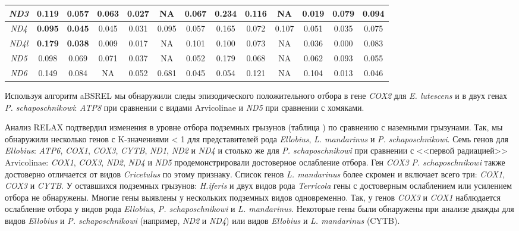 \begin{landscape}
\begin{table}[]
\begin{tabular}{|c|c|c|c|c|c|c|c|c|c|c|c|c|}
			\textit{ND3} & 0.119 & 0.057 & 0.063 & 0.027 & NA & 0.067 & 0.234 & 0.116 & NA & 0.019 & 0.079& 0.094 \\ \hline
			\textit{ND4} & \textbf{0.095} & \textbf{0.045} & 0.045 & 0.031 & 0.095 & 0.057 & 0.165 & 0.072 & 0.107 & 0.051 & 0.035& 0.075 \\ \hline
			\textit{ND4l} & \textbf{0.179} & \textbf{0.038} & 0.009 & 0.017 & NA & 0.101 & 0.100 & 0.073 & NA & 0.036 & 0.000& 0.083 \\ \hline
			{\textit{ND5}} & 0.098 & 0.069 & 0.071 & 0.037 & NA & 0.052 & 0.179 & 0.068 & NA & 0.062 & 0.093& 0.055 \\ \hline
			\textit{ND6} & 0.149 & 0.084 & NA & 0.052 & 0.681 & 0.045 & 0.054 & 0.121 & NA & 0.104 & 0.013& 0.046 \\ \hline
			
		\end{tabular}
	\end{table}

\end{landscape}


Используя алгоритм aBSREL мы обнаружили следы эпизодического положительного отбора в гене \textit{COX2} для \textit{E. lutescens} и в двух генах \textit{P. schaposchnikowi}: \textit{ATP8} при сравнении с видами Arvicolinae и \textit{ND5} при сравнении с хомяками.


Анализ RELAX подтвердил изменения в уровне отбора подземных грызунов (таблица ) по сравнению с наземными грызунами. Так, мы обнаружили несколько генов с K-значениями < 1 для представителей рода \textit{Ellobius}, \textit{L. mandarinus} и \textit{P. schaposchnikowi}. Семь генов для \textit{Ellobius}: \textit{ATP6}, \textit{COX1}, \textit{COX3}, \textit{CYTB}, \textit{ND1}, \textit{ND2} и \textit{ND4} и столько же для \textit{P. schaposchnikowi} при сравнении с <<первой радиацией>> Arvicolinae: \textit{COX1}, \textit{COX3}, \textit{ND2}, \textit{ND4} и \textit{ND5} продемонстрировали достоверное ослабление отбора. Ген \textit{COX3} \textit{P. schaposchnikowi} также достоверно отличается от видов \textit{Cricetulus} по этому признаку. Список генов \textit{L. mandarinus} более скромен и включает всего три: \textit{COX1}, \textit{COX3} и \textit{CYTB}. У оставшихся подземных грызунов: \textit{H.iferis} и двух видов рода \textit{Terricola} гены с достоверным ослаблением или усилением отбора не обнаружены.
Многие гены выявлены у нескольких подземных видов одновременно. Так, у генов \textit{COX3} и \textit{COX1} наблюдается ослабление отбора у видов рода \textit{Ellobius}, \textit{P. schaposchnikowi} и \textit{L. mandarinus}. Некоторые гены были обнаружены при анализе дважды для видов \textit{Ellobius} и \textit{P. schaposchnikowi} (например, \textit{ND2} и \textit{ND4}) или видов \textit{Ellobius} и \textit{L. mandarinus} (CYTB).

